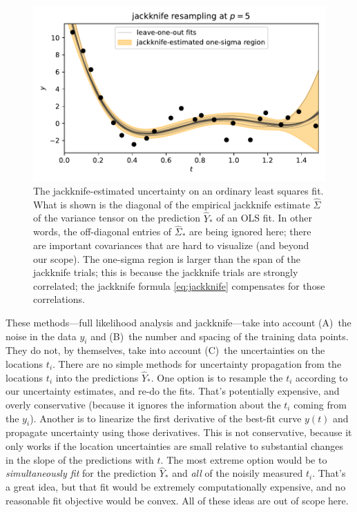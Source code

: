 \documentclass[12pt,letterpaper]{article}
\newlength{\figurewidth}
\begin{document}
\begin{figure}[t]
    \begin{mdframed}
    \includegraphics[width=\figurewidth]{./uncertainty.pdf}
    \caption{The jackknife-estimated uncertainty on an ordinary least squares fit. What is shown is the diagonal of the empirical jackknife estimate $\hat{\Sigma}$ of the variance tensor on the prediction $\hat{Y}_\ast$ of an OLS fit. In other words, the off-diagonal entries of $\hat{\Sigma}_\ast$ are being ignored here; there are important covariances that are hard to visualize (and beyond our scope). The one-sigma region is larger than the span of the jackknife trials; this is because the jackknife trials are strongly correlated; the jackknife formula \eqref{eq:jackknife} compensates for those correlations.}
    \label{fig:uncertainty}
    \end{mdframed}
\end{figure}

These methods---full likelihood analysis and jackknife---take into account (A)~the noise in the data $y_i$ and (B)~the number and spacing of the training data points.
They do not, by themselves, take into account (C)~the uncertainties on the locations $t_i$.
There are no simple methods for uncertainty propagation from the locations $t_i$ into the predictions $\hat{Y}_\ast$.
One option is to resample the $t_i$ according to our uncertainty estimates, and re-do the fits.
That's potentially expensive, and overly conservative (because it ignores the information about the $t_i$ coming from the $y_i$).
Another is to linearize the first derivative of the best-fit curve $y(t)$ and propagate uncertainty using those derivatives.
This is not conservative, because it only works if the location uncertainties are small relative to substantial changes in the slope of the predictions with $t$.
The most extreme option would be to \emph{simultaneously fit} for the prediction $\hat{Y}_\ast$ and \emph{all} of the noisily measured $t_i$.
That's a great idea, but that fit would be extremely computationally expensive, and no reasonable fit objective would be convex.
All of these ideas are out of scope here.
\end{document}
